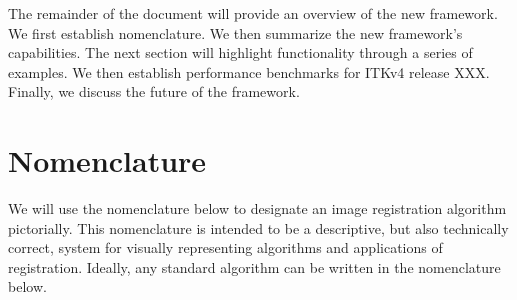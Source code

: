 \documentclass{article}
\begin{document}

The remainder of the document will provide an overview of the new
framework.  We first establish nomenclature.  We then summarize the
new framework's capabilities.  The next section will highlight
functionality through a series of examples.  We then establish
performance benchmarks for ITKv4 release XXX.  Finally, we discuss the
future of the framework.

\section{Nomenclature}
We will use the nomenclature below to designate an image registration
algorithm pictorially.  This nomenclature is intended to be a
descriptive, but also technically correct, system for visually
representing algorithms and applications of registration.  Ideally,
any standard algorithm can be written in the nomenclature below.
\end{document}
